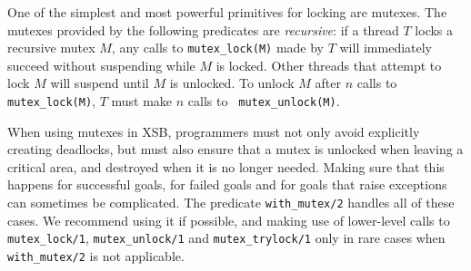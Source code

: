 One of the simplest and most powerful primitives for locking are
mutexes.  The mutexes provided by the following predicates are {\em
  recursive}: if a thread $T$ locks a recursive mutex $M$, any calls
to {\tt mutex\_lock(M)} made by $T$ will immediately succeed without
suspending while $M$ is locked.  Other threads that attempt to lock
$M$ will suspend until $M$ is unlocked.  To unlock $M$ after $n$ calls
to {\tt mutex\_lock(M)}, $T$ must make $n$ calls to {\tt
  mutex\_unlock(M)}.

When using mutexes in XSB, programmers must not only avoid explicitly
creating deadlocks, but must also ensure that a mutex is unlocked when
leaving a critical area, and destroyed when it is no longer needed.
Making sure that this happens for successful goals, for failed goals
and for goals that raise exceptions can sometimes be complicated.  The
predicate {\tt with\_mutex/2} handles all of these cases.  We
recommend using it if possible, and making use of lower-level calls to
{\tt mutex\_lock/1}, {\tt mutex\_unlock/1} and {\tt mutex\_trylock/1}
only in rare cases when {\tt with\_mutex/2} is not applicable.


